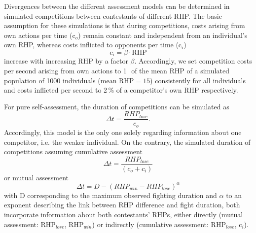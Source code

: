 Divergences between the different assessment models can be determined in simulated competitions between contestants of different RHP. The basic assumption for these simulations is that during competitions, costs arising from own actions per time (c$_o$) remain constant and independent from an individual's own RHP, whereas costs inflicted to opponents per time (c$_i$)
\begin{equation}
\label{inflicted_costs}
c_i = \beta \cdot \text{RHP}
\end{equation}
increase with increasing RHP by a factor $\beta$. Accordingly, we set competition costs per second arising from own actions to 1\,\textperthousand\, of the mean RHP of a simulated population of 1000 individuals ($\text{mean RHP} = 15$) consistently for all individuals and costs inflicted per second to 2\,\% of a competitor's own RHP respectively. 

For pure self-assessment, the duration of competitions can be simulated as 
\begin{equation}
\label{self_assessment}
\Delta t = \frac{RHP_{lose}}{c_o}.
\end{equation}
Accordingly, this model is the only one solely regarding information about one competitor, i.e. the weaker individual. On the contrary, the simulated duration of competitions assuming cumulative assessment
 \begin{equation}
\label{cum_assessment}
\Delta t = \frac{RHP_{lose}}{(c_o + c_i)}
\end{equation}
or mutual assessment
\begin{equation}
\label{mutual_assessment}
\Delta t = D - (RHP_{win} - RHP_{lose})^{\alpha}
\end{equation}
with D corresponding to the maximum observed fighting duration and $\alpha$ to an exponent describing the link between RHP difference and fight duration, both incorporate information about both contestants' RHPs, either directly (mutual assessment: RHP$_{lose}$, RHP$_{win}$) or indirectly (cumulative assessment: RHP$_{lose}$, c$_i$). 


